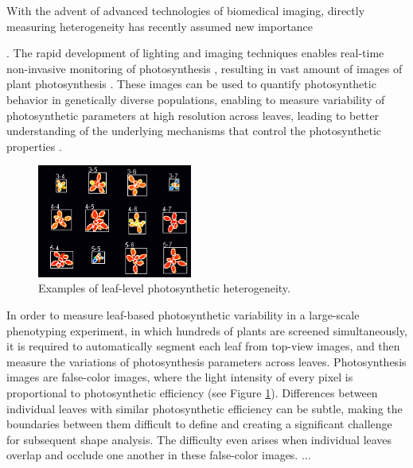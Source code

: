 \documentclass[times,11pt]{article}
\begin{document}
With the advent of advanced technologies of biomedical imaging, directly measuring heterogeneity has recently assumed new importance {\cite{cruz2014depi,tiihonen1996cerebral,wieneke1999non,wang2000}. The rapid development of lighting and imaging techniques enables real-time non-invasive monitoring of photosynthesis \cite{cruz2014depi,houle2010phenomics}, resulting in vast amount of images of plant photosynthesis \cite{wituszynska2013multivariable}. These images can be used to quantify photosynthetic behavior in genetically diverse populations, enabling to measure variability of photosynthetic parameters at high resolution across leaves, leading to better understanding of the underlying mechanisms that control the photosynthetic properties \cite{fiorani2013future,rascher2011non}.

\begin{figure}[!t]
\begin{center}
\includegraphics[width=2in]{preprocessing.png}
\caption{\small Examples of leaf-level photosynthetic heterogeneity.}
\end{center}\label{fig:heterogeneityexample}
\end{figure}

In order to measure leaf-based photosynthetic variability in a large-scale phenotyping experiment, in which hundreds of plants are screened simultaneously, it is required to automatically segment each leaf from top-view images, and then measure the variations of photosynthesis parameters across leaves.
Photosynthesis images are false-color images, where the light intensity of every pixel is proportional to photosynthetic efficiency \cite{toet1996new} (see Figure \ref{fig:heterogeneityexample}). Differences between individual leaves with similar photosynthetic efficiency can be subtle, making the boundaries between them difficult to define and creating a significant challenge for subsequent shape analysis. The difficulty even arises when individual leaves overlap and occlude one another in these false-color images.
...


}
\end{document}

